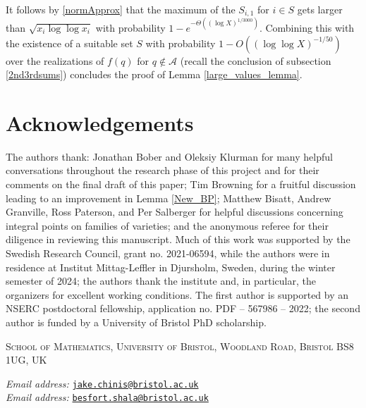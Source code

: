 \documentclass[11pts]{amsart}
\numberwithin{equation}{section}
\begin{document}
It follows by \eqref{normApprox} that the maximum of the $S_{i,1}$ for $i\in S$ gets larger than $\sqrt{x_i\log\log x_i}$ with probability $1- e^{-\Theta((\log X)^{1/3000})}$. Combining this with the existence of a suitable set $S$ with probability $1-O((\log\log X)^{-1/50})$ over the realizations of $f(q)$ for $q\not\in\mathcal A$ (recall the conclusion of subsection \ref{2nd3rdsums}) concludes the proof of Lemma \ref{large_values_lemma}.


\section{Acknowledgements}



The authors thank: Jonathan Bober and Oleksiy Klurman for many helpful conversations throughout the research phase of this project and for their comments on the final draft of this paper; Tim Browning for a fruitful discussion leading to an improvement in Lemma \ref{New_BP}; Matthew Bisatt, Andrew Granville, Ross Paterson, and Per Salberger for helpful discussions concerning integral points on families of varieties; and the anonymous referee for their diligence in reviewing this manuscript. Much of this work was supported by the Swedish Research Council, grant no. 2021-06594, while the authors were in residence at Institut Mittag-Leffler in Djursholm, Sweden, during the winter semester of 2024; the authors thank the institute and, in particular, the organizers for excellent working conditions. The first author is supported by an NSERC postdoctoral fellowship, application no. PDF – 567986 – 2022; the second author is funded by a University of Bristol PhD scholarship.

 





\textsc{School of Mathematics, University of Bristol, Woodland Road, Bristol BS8 1UG, UK}

\textit{Email address:} \href{mailto:jake.chinis@bristol.ac.uk}{{\texttt{jake.chinis@bristol.ac.uk}}}\\
\indent\textit{Email address:} \href{mailto:besfort.shala@bristol.ac.uk}{{\texttt{besfort.shala@bristol.ac.uk}}}
\end{document}
